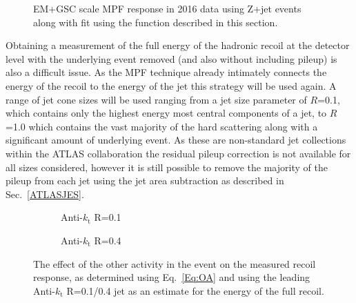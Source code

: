 \begin{figure}[!ht]
 \begin{center}
 \end{center}
 \caption[Jet Response fit example]
 {\small EM+GSC scale MPF response in 2016 data using Z+jet events along with fit using the function described in this section.  }
 \label{Fig:ResponseFitExample}
\end{figure}


Obtaining a measurement of the full energy of the hadronic recoil at the detector level with the underlying event removed (and also without including pileup) is also a difficult issue.  
As the MPF technique already intimately connects the energy of the recoil to the energy of the jet this strategy will be used again.  
A range of jet cone sizes will be used ranging from a jet size parameter of $R$=0.1, which contains only the highest energy most central components of a jet, to $R$=1.0 which contains the vast majority of the hard scattering along with a significant amount of underlying event.   
As these are non-standard jet collections within the ATLAS collaboration the residual pileup correction is not available for all sizes considered, however it is still possible to remove the majority of the pileup from each jet using the jet area subtraction as described in Sec.~\ref{ATLASJES}.  

\begin{figure}[!ht]
  \centering
  \begin{subfigure}{.5\textwidth}
    \centering
    \caption{Anti-$k_\mathrm{t}$ R=0.1}
  \end{subfigure}%
  \begin{subfigure}{.5\textwidth}  \centering
    \caption{Anti-$k_\mathrm{t}$ R=0.4}
  \end{subfigure}
  \caption{The effect of the other activity in the event on the measured recoil response, as determined using Eq.~\ref{Eq:OA} and using the leading Anti-$k_\mathrm{t}$ R=0.1/0.4 jet as an estimate for the energy of the full recoil.  }
  \label{Fig:OA_1-4}
\end{figure}


